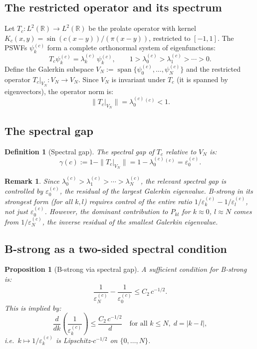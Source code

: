 \documentclass[12pt,a4paper]{article}
\newtheorem{proposition}[theorem]{Proposition}
\newtheorem{definition}[theorem]{Definition}
\newtheorem{remark}[theorem]{Remark}
\newcommand{\lam}[1]{\lambda_{#1}^{(c)}}
\newcommand{\eps}[1]{\varepsilon_{#1}^{(c)}}
\newcommand{\pswf}[1]{\psi_{#1}^{(c)}}
\newcommand{\Tc}{T_c}
\newcommand{\VN}{V_N}
\begin{document}
\subsection{The restricted operator and its spectrum}

Let $\Tc : L^2(\mathbb{R}) \to L^2(\mathbb{R})$ be the
prolate operator with kernel
$K_c(x,y) = \sin(c(x-y))/(\pi(x-y))$,
restricted to $[-1,1]$.
The PSWFs $\pswf{k}$ form a complete orthonormal system
of eigenfunctions:
\[
  \Tc \pswf{k} = \lam{k}\,\pswf{k},
  \qquad 1 > \lam{0} > \lam{1} > \cdots > 0.
\]
Define the Galerkin subspace
$\VN := \operatorname{span}\{\pswf{0},\ldots,\pswf{N}\}$
and the restricted operator $\Tc|_{\VN} : \VN \to \VN$.
Since $\VN$ is invariant under $\Tc$ (it is spanned by
eigenvectors), the operator norm is:
\[
  \|\Tc|_{\VN}\| = \lam{0}^{(c)} < 1.
\]

\subsection{The spectral gap}

\begin{definition}[Spectral gap]
The \emph{spectral gap} of $\Tc$ relative to $\VN$ is:
\[
  \gamma(c) := 1 - \|\Tc|_{\VN}\| = 1 - \lam{0}^{(c)} = \eps{0}.
\]
\end{definition}

\begin{remark}
Since $\lam{0} > \lam{1} > \cdots > \lam{N}$,
the relevant spectral gap is controlled by $\eps{0}$,
the residual of the \emph{largest} Galerkin eigenvalue.
B-strong in its strongest form (for all $k, l$) requires
control of the entire ratio $1/\eps{k} - 1/\eps{l}$,
not just $\eps{0}$.
However, the dominant contribution to $P_{kl}$ for
$k \approx 0$, $l \approx N$ comes from $1/\eps{N}$,
the inverse residual of the \emph{smallest} Galerkin eigenvalue.
\end{remark}

\subsection{B-strong as a two-sided spectral condition}

\begin{proposition}[B-strong via spectral gap]
\label{prop:spectral_gap}
A sufficient condition for B-strong is:
\[
  \frac{1}{\eps{N}} - \frac{1}{\eps{0}} \leq C_2\,c^{-1/2}.
\]
This is implied by:
\[
  \frac{d}{dk}\left(\frac{1}{\eps{k}}\right) \leq \frac{C_2\,c^{-1/2}}{d}
  \quad \text{for all } k \leq N,\; d = |k-l|,
\]
i.e.\ $k \mapsto 1/\eps{k}$ is Lipschitz-$c^{-1/2}$ on
$\{0, \ldots, N\}$.
\end{proposition}
\end{document}
